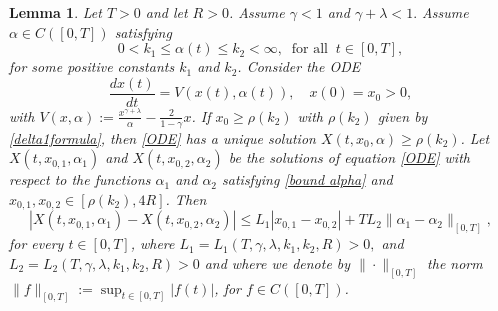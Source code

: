 \documentclass[11pt]{article}
\numberwithin{equation}{section}
\theoremstyle{plain}
\newtheorem{lemma}[theorem]{Lemma}
\begin{document}
\begin{lemma}  \label{lem:characteristics}
Let $T>0$ and let $R>0$. Assume $\gamma < 1 $ and $\gamma + \lambda <1.$
Assume $\alpha  \in C([0, T]) $ satisfying 
\begin{equation} \label{bound alpha}
0 < k_1  \leq \alpha(t)  \leq k_2 < \infty, \ \text{ for all } \ t \in [0, T], 
\end{equation}
for some positive constants $k_1$ and $k_2$. 
Consider the ODE 
\begin{equation} \label{ODE} 
\frac{d x(t) } {dt}=  V(x(t), \alpha(t)), \quad x(0)=x_0 >0,
\end{equation} 
with $V(x, \alpha):=\frac{x^{\gamma +\lambda} }{\alpha}- \frac{2}{1-\gamma} x $. 
If $x_0\geq \rho(k_2)$ with $\rho(k_2)$ given by \eqref{delta1formula},
then \eqref{ODE} has a unique solution $X(t,x_0, \alpha) \geq \rho(k_2)$.
Let $X(t, x_{0,1}, \alpha_1)$ and $X(t, x_{0,2}, \alpha_2)$ be the solutions of equation \eqref{ODE} with respect to the functions $\alpha_1$ and $\alpha_2$ satisfying \eqref{bound alpha} and $x_{0,1},x_{0,2} \in[\rho(k_2),4R]$.
Then 
\begin{equation} \label{bounds for the ODE}
|X(t,x_{0,1}, \alpha_1) - X(t,x_{0,2}, \alpha_2) |\leq L_1 |x_{0,1}-x_{0,2}| +  T L_2 \|\alpha_1-\alpha_2 \|_{[0,T]}, 
\end{equation}
 for every  $t \in [0, T]$, where $L_1=L_1(T, \gamma, \lambda,k_1, k_2, R)>0,$ and $ L_2=L_2(T, \gamma, \lambda,k_1, k_2, R)>0$ and 
 where we denote by $\|\cdot\|_{[0,T]}$ the norm $\| f \|_{[0,T]}:= \sup_{ t \in [0, T]} | f(t) |$, for $f\in C([0,T])$. 
\end{lemma} 
\end{document}
